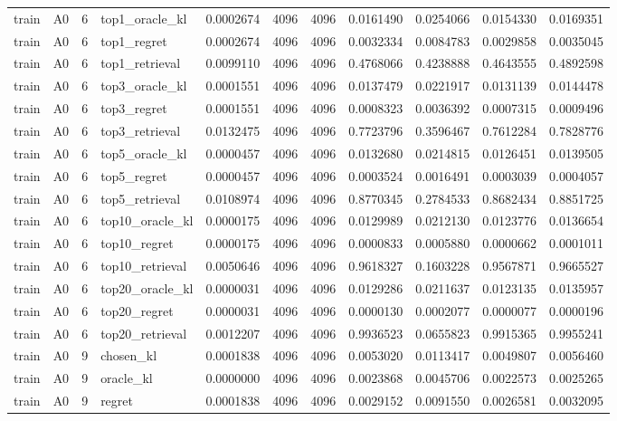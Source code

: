 \begin{tabular}{llrlrrrrrrr}
train & A0 & 6 & top1_oracle_kl & 0.0002674 & 4096 & 4096 & 0.0161490 & 0.0254066 & 0.0154330 & 0.0169351 \\
train & A0 & 6 & top1_regret & 0.0002674 & 4096 & 4096 & 0.0032334 & 0.0084783 & 0.0029858 & 0.0035045 \\
train & A0 & 6 & top1_retrieval & 0.0099110 & 4096 & 4096 & 0.4768066 & 0.4238888 & 0.4643555 & 0.4892598 \\
train & A0 & 6 & top3_oracle_kl & 0.0001551 & 4096 & 4096 & 0.0137479 & 0.0221917 & 0.0131139 & 0.0144478 \\
train & A0 & 6 & top3_regret & 0.0001551 & 4096 & 4096 & 0.0008323 & 0.0036392 & 0.0007315 & 0.0009496 \\
train & A0 & 6 & top3_retrieval & 0.0132475 & 4096 & 4096 & 0.7723796 & 0.3596467 & 0.7612284 & 0.7828776 \\
train & A0 & 6 & top5_oracle_kl & 0.0000457 & 4096 & 4096 & 0.0132680 & 0.0214815 & 0.0126451 & 0.0139505 \\
train & A0 & 6 & top5_regret & 0.0000457 & 4096 & 4096 & 0.0003524 & 0.0016491 & 0.0003039 & 0.0004057 \\
train & A0 & 6 & top5_retrieval & 0.0108974 & 4096 & 4096 & 0.8770345 & 0.2784533 & 0.8682434 & 0.8851725 \\
train & A0 & 6 & top10_oracle_kl & 0.0000175 & 4096 & 4096 & 0.0129989 & 0.0212130 & 0.0123776 & 0.0136654 \\
train & A0 & 6 & top10_regret & 0.0000175 & 4096 & 4096 & 0.0000833 & 0.0005880 & 0.0000662 & 0.0001011 \\
train & A0 & 6 & top10_retrieval & 0.0050646 & 4096 & 4096 & 0.9618327 & 0.1603228 & 0.9567871 & 0.9665527 \\
train & A0 & 6 & top20_oracle_kl & 0.0000031 & 4096 & 4096 & 0.0129286 & 0.0211637 & 0.0123135 & 0.0135957 \\
train & A0 & 6 & top20_regret & 0.0000031 & 4096 & 4096 & 0.0000130 & 0.0002077 & 0.0000077 & 0.0000196 \\
train & A0 & 6 & top20_retrieval & 0.0012207 & 4096 & 4096 & 0.9936523 & 0.0655823 & 0.9915365 & 0.9955241 \\
train & A0 & 9 & chosen_kl & 0.0001838 & 4096 & 4096 & 0.0053020 & 0.0113417 & 0.0049807 & 0.0056460 \\
train & A0 & 9 & oracle_kl & 0.0000000 & 4096 & 4096 & 0.0023868 & 0.0045706 & 0.0022573 & 0.0025265 \\
train & A0 & 9 & regret & 0.0001838 & 4096 & 4096 & 0.0029152 & 0.0091550 & 0.0026581 & 0.0032095 \\

\end{tabular}
